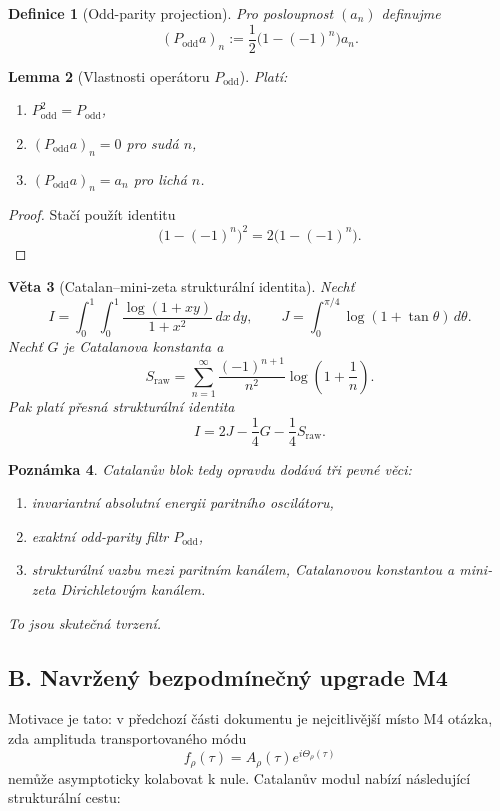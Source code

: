 \documentclass[11pt,a4paper]{article}
\newtheorem{theorem}{Věta}[section]
\newtheorem{lemma}[theorem]{Lemma}
\newtheorem{definition}[theorem]{Definice}
\newtheorem{remark}[theorem]{Poznámka}
\begin{document}
\begin{definition}[Odd-parity projection]
Pro posloupnost \((a_n)\) definujme
\[
(P_{\mathrm{odd}}a)_n:=\frac12\bigl(1-(-1)^n\bigr)a_n.
\]
\end{definition}

\begin{lemma}[Vlastnosti operátoru \(P_{\mathrm{odd}}\)]
Platí:
\begin{enumerate}[label=\textbf{(\arabic*)}]
\item \(P_{\mathrm{odd}}^2=P_{\mathrm{odd}}\),
\item \((P_{\mathrm{odd}}a)_n=0\) pro sudá \(n\),
\item \((P_{\mathrm{odd}}a)_n=a_n\) pro lichá \(n\).
\end{enumerate}
\end{lemma}

\begin{proof}
Stačí použít identitu
\[
\bigl(1-(-1)^n\bigr)^2=2\bigl(1-(-1)^n\bigr).
\]
\end{proof}

\begin{theorem}[Catalan--mini-zeta strukturální identita]
Nechť
\[
I=\int_0^1\int_0^1 \frac{\log(1+xy)}{1+x^2}\,dx\,dy,
\qquad
J=\int_0^{\pi/4}\log(1+\tan\theta)\,d\theta.
\]
Nechť \(G\) je Catalanova konstanta a
\[
S_{\mathrm{raw}}=
\sum_{n=1}^\infty \frac{(-1)^{n+1}}{n^2}\log\!\left(1+\frac1n\right).
\]
Pak platí přesná strukturální identita
\[
I=2J-\frac14 G-\frac14 S_{\mathrm{raw}}.
\]
\end{theorem}

\begin{remark}
Catalanův blok tedy opravdu dodává tři pevné věci:
\begin{enumerate}[label=\textbf{(\arabic*)}]
\item invariantní absolutní energii paritního oscilátoru,
\item exaktní odd-parity filtr \(P_{\mathrm{odd}}\),
\item strukturální vazbu mezi paritním kanálem, Catalanovou konstantou a mini-zeta Dirichletovým kanálem.
\end{enumerate}
To jsou skutečná tvrzení.
\end{remark}

\subsection*{B. Navržený bezpodmínečný upgrade M4}

Motivace je tato: v předchozí části dokumentu je nejcitlivější místo M4 otázka, zda amplituda
transportovaného módu
\[
f_\rho(\tau)=A_\rho(\tau)e^{i\Theta_\rho(\tau)}
\]
nemůže asymptoticky kolabovat k nule. Catalanův modul nabízí následující strukturální cestu:
\end{document}
